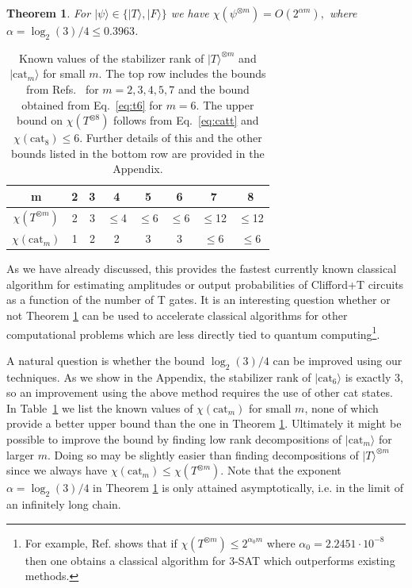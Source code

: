 \documentclass[a4paper,onecolumn,11pt,accepted=2021-11-11]{quantumarticle}
\newtheorem{theorem}{Theorem}
\newcommand{\cat}{\text{cat}}
\newcommand{\ket}[1]{\ensuremath{\lvert #1 \rangle}}
\begin{document}
 \begin{theorem}\label{res magic}
For $\ket{\psi} \in \{\ket{T}, \ket{F}\}$ we have
$
\chi(\psi^{\otimes m}) = O ( 2^{\alpha m } ),
$
where $\alpha = \log_2(3)/4 \leq 0.3963$.
\end{theorem}

\begin{table}[t]
\centering
\begin{tabular}{|c|c|c|c|c|c|c|c|}
\hline
m                 & 2 & 3 & 4       & 5       & 6       & 7        & 8        \\ \hline
$\chi(T^{\otimes m})$ & 2 & 3 & $\leq$4 & $\leq$6 & $\leq$6 & $\leq$12 & $\leq$12 \\ \hline
$\chi(\cat_m)$        & 1 & 2 & 2       & 3       & 3       & $\leq$6  & $\leq$6  \\ \hline
\end{tabular}
\caption{Known values of the stabilizer rank of $\ket{T}^{\otimes m}$ and $\ket{\cat_m}$ for small $m$. The top row includes the bounds from Refs.~\cite{bravyi2016trading, bravyi2018simulation} for $m=2,3,4,5,7$ and the bound obtained from  Eq.~\eqref{eq:t6} for $m=6$. The upper bound on $\chi(T^{\otimes 8})$ follows from Eq.~\eqref{eq:catt} and $\chi(\cat_8)\leq 6$.  Further details of this and the other bounds listed in the bottom row are provided in the Appendix.}
\label{tab}
\end{table}

As we have already discussed, this provides the fastest currently known classical algorithm for estimating amplitudes or output probabilities of Clifford+T circuits as a function of the number of T gates. It is an interesting question whether or not Theorem \ref{res magic} can be used to accelerate classical algorithms for other computational problems which are less directly tied to quantum computing\footnote{For example, Ref. \cite{huang2019tgates} shows that if $\chi(T^{\otimes m})\leq 2^{\alpha_0 m}$ where $\alpha_0=2.2451\cdot 10^{-8}$ then one obtains a classical algorithm for 3-SAT which outperforms existing methods.}.

A natural question is whether the bound $\log_2(3)/4$ can be improved using our techniques.
As we show in the Appendix, the stabilizer rank of $|\text{cat}_6\rangle$ is exactly $3$, so an improvement using the above method requires the use of other cat states.
In Table~\ref{tab} we list the known values of $\chi(\cat_m)$ for small $m$, none of which provide a better upper bound than the one in Theorem \ref{res magic}. Ultimately it might be possible to improve the bound by finding low rank decompositions of $\ket{\cat_m}$ for larger $m$. Doing so may be slightly easier than finding decompositions of $\ket{T}^{\otimes m}$ since we always have $\chi(\cat_m)\leq \chi(T^{\otimes m})$. Note that the exponent $\alpha = \log_2(3)/4$ in Theorem \ref{res magic} is only attained asymptotically, i.e. in the limit of an infinitely long chain.
\end{document}
